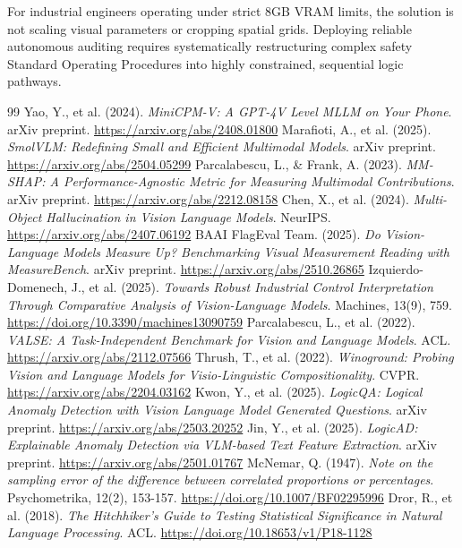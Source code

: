 \documentclass{article}
\begin{document}
For industrial engineers operating under strict 8GB VRAM limits, the solution is not scaling visual parameters or cropping spatial grids. Deploying reliable autonomous auditing requires systematically restructuring complex safety Standard Operating Procedures into highly constrained, sequential logic pathways.


\begin{thebibliography}{99}
 Yao, Y., et al. (2024). \textit{MiniCPM-V: A GPT-4V Level MLLM on Your Phone}. arXiv preprint. \url{https://arxiv.org/abs/2408.01800}
 Marafioti, A., et al. (2025). \textit{SmolVLM: Redefining Small and Efficient Multimodal Models}. arXiv preprint. \url{https://arxiv.org/abs/2504.05299}
 Parcalabescu, L., \& Frank, A. (2023). \textit{MM-SHAP: A Performance-Agnostic Metric for Measuring Multimodal Contributions}. arXiv preprint. \url{https://arxiv.org/abs/2212.08158}
 Chen, X., et al. (2024). \textit{Multi-Object Hallucination in Vision Language Models}. NeurIPS. \url{https://arxiv.org/abs/2407.06192}
 BAAI FlagEval Team. (2025). \textit{Do Vision-Language Models Measure Up? Benchmarking Visual Measurement Reading with MeasureBench}. arXiv preprint. \url{https://arxiv.org/abs/2510.26865}
 Izquierdo-Domenech, J., et al. (2025). \textit{Towards Robust Industrial Control Interpretation Through Comparative Analysis of Vision-Language Models}. Machines, 13(9), 759. \url{https://doi.org/10.3390/machines13090759}
 Parcalabescu, L., et al. (2022). \textit{VALSE: A Task-Independent Benchmark for Vision and Language Models}. ACL. \url{https://arxiv.org/abs/2112.07566}
 Thrush, T., et al. (2022). \textit{Winoground: Probing Vision and Language Models for Visio-Linguistic Compositionality}. CVPR. \url{https://arxiv.org/abs/2204.03162}
 Kwon, Y., et al. (2025). \textit{LogicQA: Logical Anomaly Detection with Vision Language Model Generated Questions}. arXiv preprint. \url{https://arxiv.org/abs/2503.20252}
 Jin, Y., et al. (2025). \textit{LogicAD: Explainable Anomaly Detection via VLM-based Text Feature Extraction}. arXiv preprint. \url{https://arxiv.org/abs/2501.01767}
 McNemar, Q. (1947). \textit{Note on the sampling error of the difference between correlated proportions or percentages}. Psychometrika, 12(2), 153-157. \url{https://doi.org/10.1007/BF02295996}
 Dror, R., et al. (2018). \textit{The Hitchhiker's Guide to Testing Statistical Significance in Natural Language Processing}. ACL. \url{https://doi.org/10.18653/v1/P18-1128}

\end{thebibliography}
\end{document}
